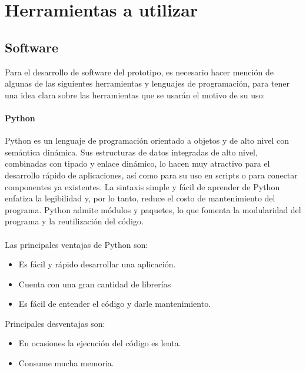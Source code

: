 \documentclass[12pt, a4paper, titlepage]{report}
\begin{document}
	   	\section{Herramientas a utilizar}
	   	\subsection{Software}
		   	Para el desarrollo de software del prototipo, es necesario hacer mención de algunas de las siguientes herramientas y lenguajes de programación, para tener una idea clara sobre las herramientas que se usarán el motivo de su uso:
		   	\paragraph{Python \\}
		   	Python es un lenguaje de programación orientado a objetos y de alto nivel con semántica dinámica. Sus estructuras de datos integradas de alto nivel, combinadas con tipado y enlace dinámico, lo hacen muy atractivo para el desarrollo rápido de aplicaciones, así como para su uso en scripts o para conectar componentes ya existentes. La sintaxis simple y fácil de aprender de Python enfatiza la legibilidad y, por lo tanto, reduce el costo de mantenimiento del programa. Python admite módulos y paquetes, lo que fomenta la modularidad del programa y la reutilización del código.\cite{refQuesPython}\\\\
		   	Las principales ventajas de Python son: 
		   	\begin{itemize}
		   		\item Es fácil y rápido desarrollar una aplicación.
		   		\item Cuenta con una gran cantidad de librerías
		   		\item Es fácil de entender el código y darle mantenimiento.
		   	\end{itemize}
		   	
		   	Principales desventajas son: 
		   	\begin{itemize}
		   		\item En ocasiones la ejecución del código es lenta.
		   		\item Consume mucha memoria.
		   	\end{itemize}
\end{document}
